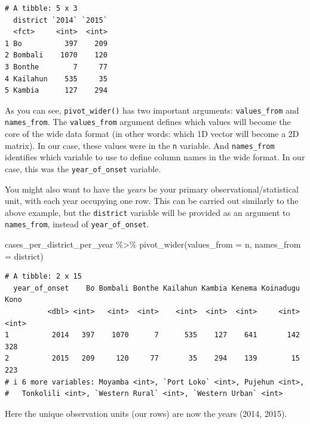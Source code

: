 \documentclass[
  letterpaper,
  DIV=11,
  numbers=noendperiod]{scrreprt}
\newenvironment{Shaded}{\begin{snugshade}}{\end{snugshade}}
\newcommand{\AttributeTok}[1]{\textcolor[rgb]{0.40,0.45,0.13}{#1}}
\newcommand{\FunctionTok}[1]{\textcolor[rgb]{0.28,0.35,0.67}{#1}}
\newcommand{\NormalTok}[1]{\textcolor[rgb]{0.00,0.23,0.31}{#1}}
\newcommand{\SpecialCharTok}[1]{\textcolor[rgb]{0.37,0.37,0.37}{#1}}
\begin{document}
\begin{verbatim}
# A tibble: 5 x 3
  district `2014` `2015`
  <fct>     <int>  <int>
1 Bo          397    209
2 Bombali    1070    120
3 Bonthe        7     77
4 Kailahun    535     35
5 Kambia      127    294
\end{verbatim}

As you can see, \texttt{pivot\_wider()} has two important arguments:
\texttt{values\_from} and \texttt{names\_from}. The
\texttt{values\_from} argument defines which values will become the core
of the wide data format (in other words: which 1D vector will become a
2D matrix). In our case, these values were in the \texttt{n} variable.
And \texttt{names\_from} identifies which variable to use to define
column names in the wide format. In our case, this was the
\texttt{year\_of\_onset} variable.

\begin{tcolorbox}[enhanced jigsaw, colframe=quarto-callout-note-color-frame, rightrule=.15mm, opacityback=0, breakable, coltitle=black, colbacktitle=quarto-callout-note-color!10!white, bottomrule=.15mm, leftrule=.75mm, toprule=.15mm, arc=.35mm, bottomtitle=1mm, colback=white, left=2mm, opacitybacktitle=0.6, titlerule=0mm, title=\textcolor{quarto-callout-note-color}{\faInfo}\hspace{0.5em}{Side Note}, toptitle=1mm]

You might also want to have the \emph{years} be your primary
observational/statistical unit, with each year occupying one row. This
can be carried out similarly to the above example, but the
\texttt{district} variable will be provided as an argument to
\texttt{names\_from}, instead of \texttt{year\_of\_onset}.

\begin{Shaded}
\begin{Highlighting}[]
\NormalTok{cases\_per\_district\_per\_year }\SpecialCharTok{\%\textgreater{}\%} 
  \FunctionTok{pivot\_wider}\NormalTok{(}\AttributeTok{values\_from =}\NormalTok{ n, }
              \AttributeTok{names\_from =}\NormalTok{ district)}
\end{Highlighting}
\end{Shaded}

\begin{verbatim}
# A tibble: 2 x 15
  year_of_onset    Bo Bombali Bonthe Kailahun Kambia Kenema Koinadugu  Kono
          <dbl> <int>   <int>  <int>    <int>  <int>  <int>     <int> <int>
1          2014   397    1070      7      535    127    641       142   328
2          2015   209     120     77       35    294    139        15   223
# i 6 more variables: Moyamba <int>, `Port Loko` <int>, Pujehun <int>,
#   Tonkolili <int>, `Western Rural` <int>, `Western Urban` <int>
\end{verbatim}

Here the unique observation units (our rows) are now the years (2014,
2015).

\end{tcolorbox}
\end{document}
